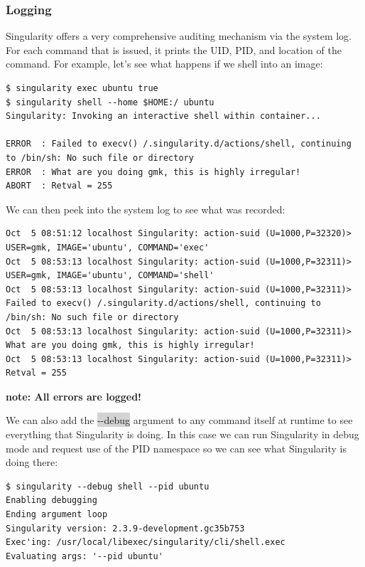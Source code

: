 \documentclass[a4paper]{article}
\newcounter{subsubsubsection}[subsubsection]
\begin{document}
\subsubsection{Logging}
Singularity offers a very comprehensive auditing mechanism via the system log. For each command that is issued, it prints the UID, PID, and location of the command. For example, let’s see what happens if we shell into an image:

\begin{lstlisting}[frame=single]
$ singularity exec ubuntu true
$ singularity shell --home $HOME:/ ubuntu
Singularity: Invoking an interactive shell within container...

ERROR  : Failed to execv() /.singularity.d/actions/shell, continuing to /bin/sh: No such file or directory
ERROR  : What are you doing gmk, this is highly irregular!
ABORT  : Retval = 255
\end{lstlisting}

We can then peek into the system log to see what was recorded:

\begin{lstlisting}[frame=single]
Oct  5 08:51:12 localhost Singularity: action-suid (U=1000,P=32320)> USER=gmk, IMAGE='ubuntu', COMMAND='exec'
Oct  5 08:53:13 localhost Singularity: action-suid (U=1000,P=32311)> USER=gmk, IMAGE='ubuntu', COMMAND='shell'
Oct  5 08:53:13 localhost Singularity: action-suid (U=1000,P=32311)> Failed to execv() /.singularity.d/actions/shell, continuing to /bin/sh: No such file or directory
Oct  5 08:53:13 localhost Singularity: action-suid (U=1000,P=32311)> What are you doing gmk, this is highly irregular!
Oct  5 08:53:13 localhost Singularity: action-suid (U=1000,P=32311)> Retval = 255
\end{lstlisting}

\textbf{note: All errors are logged!}


We can also add the \colorbox{lightgray}{-{}-debug} argument to any command itself at runtime to see everything that Singularity is doing. In this case we can run Singularity in debug mode and request use of the PID namespace so we can see what Singularity is doing there:
\begin{lstlisting}[frame=single]
$ singularity --debug shell --pid ubuntu
Enabling debugging
Ending argument loop
Singularity version: 2.3.9-development.gc35b753
Exec'ing: /usr/local/libexec/singularity/cli/shell.exec
Evaluating args: '--pid ubuntu'
\end{lstlisting}
\end{document}
